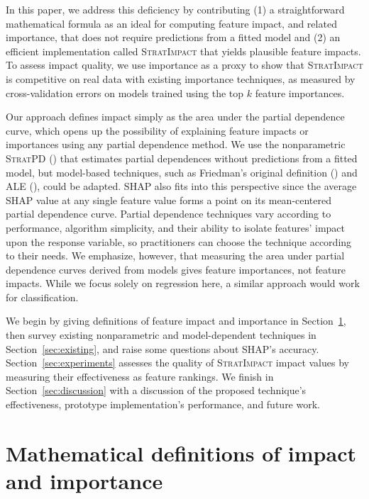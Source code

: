 \documentclass[11pt]{article}
\newcommand{\secref}[1]{Section~\ref{#1}}
\newcommand{\cut}[1]{}
\newcommand{\todo}[1]{{{\small\color{red}{[#1]}}}}
\newcommand{\simp}{\fontfamily{cmr}\textsc{\small StratImpact}}
\newcommand{\spd}{\fontfamily{cmr}\textsc{\small StratPD}}
\begin{document}
In this paper, we address this deficiency by contributing (1) a straightforward mathematical formula as an ideal for computing feature impact, and related importance, that does not require predictions from a fitted model and (2) an efficient implementation called \simp{} that yields plausible feature impacts. To assess impact quality, we use importance as a proxy to show that \simp{} is competitive on real data with existing importance techniques, as measured by cross-validation errors on models trained using the top $k$ feature importances.  

Our approach defines impact simply as the area under the partial dependence curve, which opens up the possibility of explaining feature impacts or importances using any partial dependence method.  We use the nonparametric \spd{} (\citealt{stratpd}) that estimates partial dependences without predictions from a fitted model, but model-based techniques, such as Friedman's original definition (\citealt{PDP}) and ALE (\citealt{apley2016visualizing}), could be adapted.  SHAP also fits into this perspective since the average SHAP value at any single feature value forms a point on its mean-centered partial dependence curve. Partial dependence techniques vary according to performance, algorithm simplicity, and their ability to isolate features' impact upon the response variable, so practitioners can choose the technique according to their needs. \todo{impl language. what if they don't want a model?} We emphasize, however, that measuring the area under partial dependence curves derived from models gives feature importances, not feature impacts. While we focus solely on regression here, a similar approach would work for classification.

We begin by giving definitions of feature impact and importance in \secref{sec:def}, then survey existing nonparametric and model-dependent techniques in \secref{sec:existing}, and raise some questions about SHAP's accuracy. \secref{sec:experiments} assesses the quality of \simp{} impact values by measuring their effectiveness as feature rankings. We finish in \secref{sec:discussion} with a discussion of the proposed technique's effectiveness, prototype implementation's performance, and future work.

\section{Mathematical definitions of impact and importance}\label{sec:def}

\cut{Practitioners loosely define feature importance as feature predictiveness, which presupposes a fitted predictive model, probably because importances are so often used for feature selection during model development.  Research  focuses on more accurately identifying the impact of features upon model predictions.  But, relying on a fitted model makes it difficult to tease apart the true feature importance from the ability of the model to exploit that feature for prediction purposes. Rather than measuring feature impact on {\em model predictions}, we propose avoiding the model completely to define feature importance as the average impact of a feature on the {\em data set response values}.}
\end{document}
